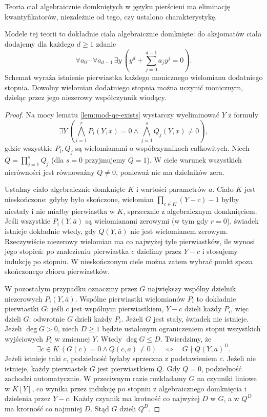 \begin{twierdzenie}
\label{thm:mod-qe-acf}
Teoria ciał algebraicznie domkniętych w języku
pierścieni ma eliminację kwantyfikatorów, niezależnie
od tego, czy ustalono charakterystykę.
\end{twierdzenie}

Modele tej teorii to dokładnie ciała algebraicznie
domknięte: do aksjomatów ciała dodajemy dla każdego
$d\geq1$ zdanie
\[
\forall a_0\cdots\forall a_{d-1}\,\exists y\,
\left(y^d+\sum_{j=0}^{d-1}a_jy^j=0\right).
\]
Schemat wyraża istnienie pierwiastka każdego monicznego
wielomianu dodatniego stopnia. Dowolny wielomian
dodatniego stopnia można uczynić monicznym,
dzieląc przez jego niezerowy współczynnik wiodący.

\begin{proof}
Na mocy lematu \ref{lem:mod-qe-exists} wystarczy
wyeliminować $Y$ z formuły
\[
\exists Y\,
\left(\bigwedge_{i=1}^{r}P_i(Y,\bar x)=0
\land \bigwedge_{j=1}^{s}Q_j(Y,\bar x)\ne0\right),
\]
gdzie wszystkie $P_i,Q_j$ są wielomianami o współczynnikach
całkowitych. Niech $Q=\prod_{j=1}^{s}Q_j$ (dla $s=0$
przyjmujemy $Q=1$). W ciele warunek wszystkich
nierówności jest równoważny $Q\ne0$, ponieważ nie ma
dzielników zera.

Ustalmy ciało algebraicznie domknięte $K$ i wartości
parametrów $\bar a$. Ciało $K$ jest nieskończone:
gdyby było skończone, wielomian
$\prod_{c\in K}(Y-c)-1$ byłby niestały i nie miałby
pierwiastka w $K$, sprzecznie z algebraicznym domknięciem.
Jeśli wszystkie $P_i(Y,\bar a)$ są wielomianami zerowymi
(w tym gdy $r=0$), świadek istnieje dokładnie wtedy,
gdy $Q(Y,\bar a)$ nie jest wielomianem zerowym.
Rzeczywiście niezerowy wielomian ma co najwyżej tyle
pierwiastków, ile wynosi jego stopień: po znalezieniu
pierwiastka $c$ dzielimy przez $Y-c$ i stosujemy
indukcję po stopniu. W nieskończonym ciele można
zatem wybrać punkt spoza skończonego zbioru pierwiastków.

W pozostałym przypadku oznaczmy przez $G$ największy
wspólny dzielnik niezerowych $P_i(Y,\bar a)$.
Wspólne pierwiastki wielomianów $P_i$ to dokładnie
pierwiastki $G$: jeśli $c$ jest wspólnym pierwiastkiem,
$Y-c$ dzieli każdy $P_i$, więc dzieli $G$; odwrotnie
$G$ dzieli każdy $P_i$.
Jeżeli $G$ jest stały, świadek nie istnieje.
Jeżeli $\deg G>0$, niech $D\geq1$ będzie ustalonym
ograniczeniem stopni wszystkich wyjściowych $P_i$
w zmiennej $Y$. Wtedy $\deg G\leq D$.
Twierdzimy, że
\[
\exists c\in K\ (G(c)=0\land Q(c,\bar a)\ne0)
\quad\Longleftrightarrow\quad
G\nmid Q(Y,\bar a)^D .
\]
Jeżeli istnieje taki $c$, podzielność byłaby sprzeczna
z podstawieniem $c$. Jeżeli nie istnieje, każdy
pierwiastek $G$ jest pierwiastkiem $Q$.
Gdy $Q=0$, podzielność zachodzi automatycznie.
W przeciwnym razie rozkładamy $G$ na czynniki liniowe
w $K[Y]$, co wynika przez indukcję po stopniu
z algebraicznego domknięcia i dzielenia przez $Y-c$.
Każdy czynnik ma krotność co najwyżej $D$ w $G$,
a w $Q^D$ ma krotność co najmniej $D$.
Stąd $G$ dzieli $Q^D$.


\end{proof}
